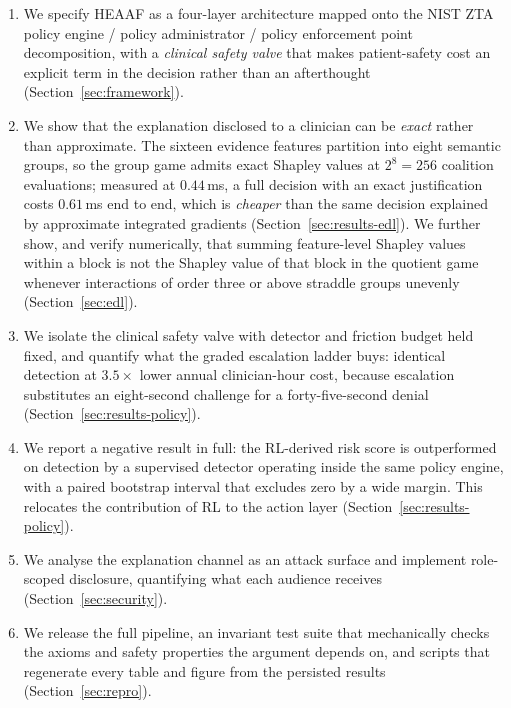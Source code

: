 \documentclass[conference]{IEEEtran}
\begin{document}
\begin{enumerate}
\item We specify HEAAF as a four-layer architecture mapped onto the NIST ZTA
policy engine / policy administrator / policy enforcement point decomposition,
with a \emph{clinical safety valve} that makes patient-safety cost an explicit
term in the decision rather than an afterthought (Section~\ref{sec:framework}).

\item We show that the explanation disclosed to a clinician can be \emph{exact}
rather than approximate. The sixteen evidence features partition into eight
semantic groups, so the group game admits exact Shapley values at $2^{8}=256$
coalition evaluations; measured at $0.44$\,ms, a full decision with an exact
justification costs $0.61$\,ms end to end, which is \emph{cheaper} than the
same decision explained by approximate integrated gradients
(Section~\ref{sec:results-edl}). We further show, and verify numerically, that
summing feature-level Shapley values within a block is not the Shapley value of
that block in the quotient game whenever interactions of order three or above
straddle groups unevenly (Section~\ref{sec:edl}).

\item We isolate the clinical safety valve with detector and friction budget
held fixed, and quantify what the graded escalation ladder buys: identical
detection at $3.5\times$ lower annual clinician-hour cost, because escalation
substitutes an eight-second challenge for a forty-five-second denial
(Section~\ref{sec:results-policy}).

\item We report a negative result in full: the RL-derived risk score is
outperformed on detection by a supervised detector operating inside the same
policy engine, with a paired bootstrap interval that excludes zero by a wide
margin. This relocates the contribution of RL to the action layer
(Section~\ref{sec:results-policy}).

\item We analyse the explanation channel as an attack surface and implement
role-scoped disclosure, quantifying what each audience receives
(Section~\ref{sec:security}).

\item We release the full pipeline, an invariant test suite that mechanically
checks the axioms and safety properties the argument depends on, and scripts
that regenerate every table and figure from the persisted results
(Section~\ref{sec:repro}).
\end{enumerate}
\end{document}
